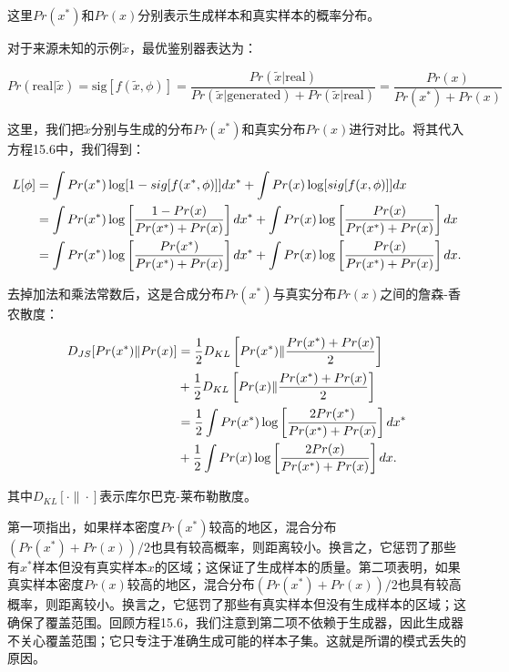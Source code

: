 \documentclass[lang=cn,newtx,10pt,scheme=chinese]{elegantbook}
\begin{document}
这里\(Pr(x^*)\)和\(Pr(x)\)分别表示生成样本和真实样本的概率分布。

对于来源未知的示例\(\tilde{x}\)，最优鉴别器表达为：

\begin{equation}
Pr(\text{real}|\tilde{x}) = \text{sig}[f(\tilde{x}, \phi)] = \frac{Pr(\tilde{x}|\text{real})}{Pr(\tilde{x}|\text{generated}) + Pr(\tilde{x}|\text{real})} = \frac{Pr(x)}{Pr(x^*) + Pr(x)} 
\end{equation}

这里，我们把\(\tilde{x}\)分别与生成的分布\(Pr(x^*)\)和真实分布\(Pr(x)\)进行对比。将其代入方程15.6中，我们得到：


\begin{align}
L[\phi] &= \int Pr(x^*) \log [1 - sig[f(x^*, \phi)]] dx^* + \int Pr(x) \log [sig[f(x, \phi)]] dx \notag\\
&= \int Pr(x^*) \log \left[ \frac{1 - Pr(x)}{Pr(x^*) + Pr(x)} \right] dx^* + \int Pr(x) \log \left[ \frac{Pr(x)}{Pr(x^*) + Pr(x)} \right] dx \notag \\
&= \int Pr(x^*) \log \left[ \frac{Pr(x^*)}{Pr(x^*) + Pr(x)} \right] dx^* + \int Pr(x) \log \left[ \frac{Pr(x)}{Pr(x^*) + Pr(x)} \right] dx. 
\end{align} 



去掉加法和乘法常数后，这是合成分布\(Pr(x^*)\)与真实分布\(Pr(x)\)之间的詹森-香农散度：


\begin{align}
D_{JS} [ Pr(x^*) \| Pr(x) ] &= \frac{1}{2} D_{KL} \left[ Pr(x^*) \| \frac{Pr(x^*) + Pr(x)}{2} \right] \notag \\
&+ \frac{1}{2} D_{KL} \left[ Pr(x) \| \frac{Pr(x^*) + Pr(x)}{2} \right] \notag \\
&= \frac{1}{2} \int Pr(x^*) \log \left[ \frac{2Pr(x^*)}{Pr(x^*) + Pr(x)} \right] dx^* \notag \\
&+ \frac{1}{2} \int Pr(x) \log \left[ \frac{2Pr(x)}{Pr(x^*) + Pr(x)} \right] dx. 
\end{align} 


其中\(D_{KL}[\cdot\|\cdot]\)表示库尔巴克-莱布勒散度。

第一项指出，如果样本密度\(Pr(x^*)\)较高的地区，混合分布\((Pr(x^*) + Pr(x))/2\)也具有较高概率，则距离较小。换言之，它惩罚了那些有\(x^*\)样本但没有真实样本\(x\)的区域；这保证了生成样本的质量。第二项表明，如果真实样本密度\(Pr(x)\)较高的地区，混合分布\((Pr(x^*) + Pr(x))/2\)也具有较高概率，则距离较小。换言之，它惩罚了那些有真实样本但没有生成样本的区域；这确保了覆盖范围。回顾方程15.6，我们注意到第二项不依赖于生成器，因此生成器不关心覆盖范围；它只专注于准确生成可能的样本子集。这就是所谓的模式丢失的原因。
\end{document}
